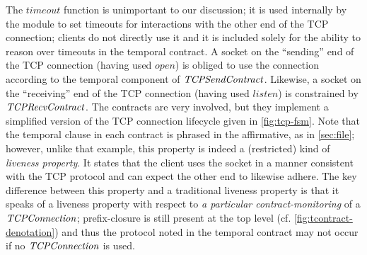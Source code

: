{%
The $timeout$ function is unimportant to our discussion; it is used internally by the module to set timeouts for interactions with the other end of the TCP connection; clients do not directly use it and it is included solely for the ability to reason over timeouts in the temporal contract.
%
A socket on the ``sending'' end of the TCP connection (having used $open$) is obliged to use the connection according to the temporal component of $\mathit{TCPSendContract}$.
%
Likewise, a socket on the ``receiving'' end of the TCP connection (having used $listen$) is constrained by $\mathit{TCPRecvContract}$.
%
The contracts are very involved, but they implement a simplified version of the TCP connection lifecycle given in \autoref{fig:tcp-fsm}.
%
Note that the temporal clause in each contract is phrased in the affirmative, as in \autoref{sec:file}; however, unlike that example, this property is indeed a (restricted) kind of \emph{liveness property}.
%
It states that the client uses the socket in a manner consistent with the TCP protocol and can expect the other end to likewise adhere.
%
The key difference between this property and a traditional liveness property is that it speaks of a liveness property with respect to \emph{a particular contract-monitoring} of a $\mathit{TCPConnection}$; prefix-closure is still present at the top level (cf. \autoref{fig:tcontract-denotation}) and thus the protocol noted in the temporal contract may not occur if no $\mathit{TCPConnection}$ is used.
}
